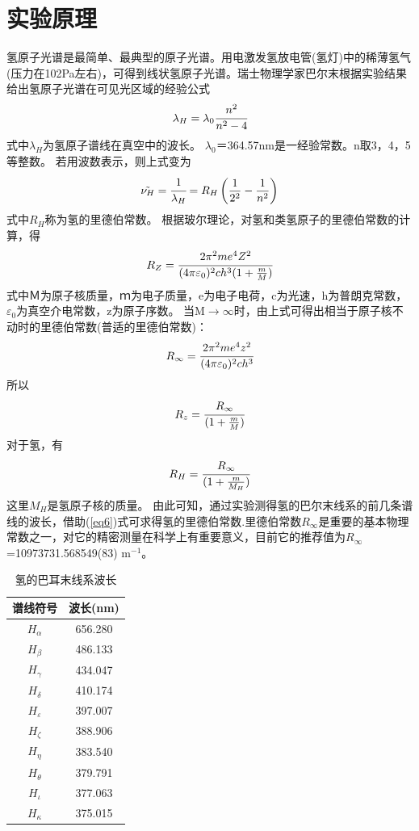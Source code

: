 \documentclass[a4paper]{article}
\begin{document}
\section{实验原理}
氢原子光谱是最简单、最典型的原子光谱。用电激发氢放电管(氢灯)中的稀薄氢气(压力在102Pa左右)，可得到线状氢原子光谱。瑞士物理学家巴尔末根据实验结果给出氢原子光谱在可见光区域的经验公式
\begin{equation}
\lambda_H = \lambda_0\cfrac{n^2}{n^2-4}
\end{equation}
式中$\lambda_H$为氢原子谱线在真空中的波长。
$\lambda_0$＝364.57nm是一经验常数。n取3，4，5等整数。 若用波数表示，则上式变为
\begin{equation}
\tilde{\nu_H} = \cfrac{1}{\lambda_H} = R_H\left(\frac{1}{2^2} - \frac{1}{n^2}\right)
\end{equation}
式中$R_H$称为氢的里德伯常数。
根据玻尔理论，对氢和类氢原子的里德伯常数的计算，得
\begin{equation}
R_Z = \cfrac{2\pi^2me^4Z^2}{(4\pi\varepsilon_0)^2ch^3(1+\frac{m}{M})}
\end{equation}
式中Ｍ为原子核质量，ｍ为电子质量，e为电子电荷，c为光速，h为普朗克常数，$\varepsilon_0$为真空介电常数，z为原子序数。 
当M$\to \infty$时，由上式可得出相当于原子核不动时的里德伯常数(普适的里德伯常数)：
\begin{equation}
R_{\infty} = \cfrac{2\pi^2me^4z^2}{(4\pi\varepsilon_0)^2ch^3}
\end{equation}
所以
\begin{equation}
R_z = \cfrac{R_{\infty}}{(1+\frac{m}{M})}
\end{equation}
对于氢，有
\begin{equation}
R_H = \cfrac{R_{\infty}}{(1+\frac{m}{M_H})}\label{eq6}
\end{equation}
这里$M_H$是氢原子核的质量。
由此可知，通过实验测得氢的巴尔末线系的前几条谱线的波长，借助(\ref{eq6})式可求得氢的里德伯常数.里德伯常数$R_{\infty}$是重要的基本物理常数之一，对它的精密测量在科学上有重要意义，目前它的推荐值为$R_{\infty}$=10973731.568549(83)$\text{ m}^{-1}$。
\begin{table}[!h]
\centering
\caption{氢的巴耳末线系波长}
\label{table1}
\begin{tabular}{|c|c|}
\hline
谱线符号              & 波长(nm)  \\ \hline
$H_{\alpha}$      & 656.280 \\ \hline
$H_{\beta}$       & 486.133 \\ \hline
$H_{\gamma}$      & 434.047 \\ \hline
$H_{\delta}$      & 410.174 \\ \hline
$H_{\varepsilon}$ & 397.007 \\ \hline
$H_{\zeta}$       & 388.906 \\ \hline
$H_{\eta}$        & 383.540 \\ \hline
$H_{\theta}$      & 379.791 \\ \hline
$H_{\iota}$       & 377.063 \\ \hline
$H_{\kappa}$      & 375.015 \\ \hline
\end{tabular}
\end{table}
\end{document}
